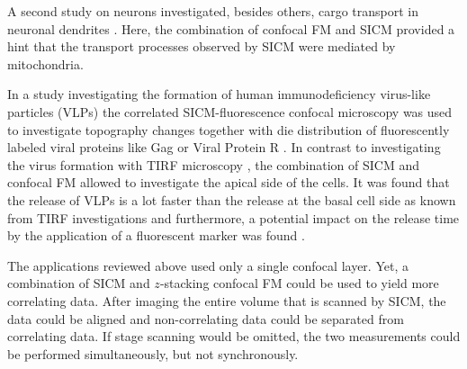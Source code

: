 A second study on neurons investigated, besides others, cargo transport in
neuronal dendrites \cite{Takahashi2019}. Here, the combination of
confocal FM and SICM provided a hint that the transport processes observed by
SICM were mediated by mitochondria.

In a study investigating the formation of human immunodeficiency virus-like
particles (VLPs) the correlated SICM-fluorescence confocal microscopy was used
to investigate topography changes together with die distribution of
fluorescently labeled viral proteins like Gag or Viral Protein R
\cite{Bednarska2020}. In contrast to investigating the virus formation with
TIRF microscopy \cite{Jouvenet2008}, the combination of SICM and confocal FM
allowed to investigate the apical side of the cells. It was found that the
release of VLPs is a lot faster than the release at the basal cell side as
known from TIRF investigations and furthermore, a potential impact on the
release time by the application of a fluorescent marker was found
\cite{Bednarska2020}.

The applications reviewed above used only a single confocal layer. Yet,
a combination of SICM and $z$-stacking confocal FM could be used to yield more
correlating data. After imaging the entire volume that is scanned by SICM, the
data could be aligned and non-correlating data could be separated from
correlating data. If stage scanning would be omitted, the two measurements
could be performed simultaneously, but not synchronously.  


%



